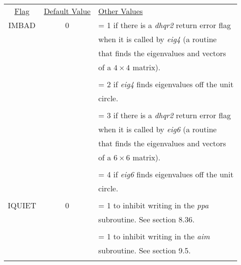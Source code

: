 \newpage
\begin{tabular}{ccl}
\underline{Flag} & \hspace{.5in}  \underline{Default Value} & \hspace{.5in}  \underline{Other Values} \\
IMBAD & 0 &  \hspace{.5in} = 1 if there is a {\em dhqr2} return error flag \\
&&  \hspace{.71in} when it is called by {\em eig4} (a routine \\
&&  \hspace{.71in} that finds the eigenvalues and vectors\\
&&  \hspace{.71in} of a $4 \times 4$ matrix).\\
&& \\
&&  \hspace{.5in} = 2 if {\em eig4} finds eigenvalues off the unit\\
&&  \hspace{.71in} circle. \\
&& \\
&&  \hspace{.5in} = 3 if there is a {\em dhqr2} return error flag \\
&&  \hspace{.71in} when it is called  by {\em eig6} (a routine \\
&&  \hspace{.71in} that finds the eigenvalues and vectors\\
&&  \hspace{.71in} of a $6 \times 6$ matrix).\\
&& \\
&&  \hspace{.5in} = 4 if {\em eig6} finds eigenvalues off the unit\\
&&  \hspace{.71in} circle.\\
&& \\
IQUIET & 0 &  \hspace{.5in} = 1 to inhibit writing in the {\em ppa} \\
&&  \hspace{.71in} subroutine.  See section 8.36.\\
&& \\
&&  \hspace{.5in} = 1 to inhibit writing in the {\em aim} \\
&&  \hspace{.71in} subroutine.  See section 9.5.\\
&& \\
\end{tabular}

